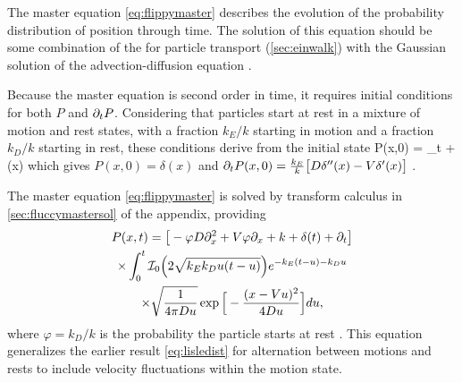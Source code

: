 The master equation \ref{eq:flippymaster} describes the evolution of the probability distribution of position through time. The solution of this equation should be some combination of the \citet{Einstein1937} \DIFdelbegin {}\DIFdelend \DIFaddbegin {}\DIFaddend for particle transport (\DIFdelbegin {}\DIFdelend \DIFaddbegin {}\DIFaddend \ref{sec:einwalk}) with the Gaussian solution of the advection-diffusion equation \DIFdelbegin {}\DIFdelend \DIFaddbegin {}\DIFaddend .

Because the master equation is second order in time, it requires initial conditions for both $P$ and $\partial_t P$. Considering that particles start at rest in a mixture of motion and rest states, with a fraction $k_E/k$ starting in motion and a fraction $k_D/k$ starting in rest, these conditions derive from the initial state 
\be P(x,0) = \lim_{t }   \exp{}+ \delta(x)\ee
which gives $P(x,0) = \delta(x)$ and $ \partial_t P(x,0) = \frac{k_E}{k}\big[D\delta''(x)-V \delta'(x) \big]$ \DIFdelbegin {}\DIFdelend \DIFaddbegin {}\DIFaddend .

The master equation \ref{eq:flippymaster} is solved by transform calculus in \DIFdelbegin {}\DIFdelend \DIFaddbegin {}\DIFaddend \ref{sec:fluccymastersol} of the appendix, providing
\begin{multline} P(x,t) = \big[-\varphi D\partial_x^2 + V\varphi \partial_x + k + \delta(t) +  \partial_t \big]\\
	\times \int_0^t \mathcal{I}_0\Big( 2 \sqrt{k_Ek_D u(t-u)}\Big) e^{-k_E(t-u)-k_D u} \\ \times \sqrt{ \frac{1}{4\pi D u}} \exp\Big[- \frac{(x-Vu)^2}{4Du}\Big] du, \label{eq:monster}
 \end{multline}
where $\varphi=k_D/k$ is the probability the particle starts at rest \DIFaddbegin {}\DIFaddend . This equation generalizes the earlier result \DIFaddbegin {}\DIFaddend \ref{eq:lisledist} for alternation between motions and rests to include velocity fluctuations within the motion state.

